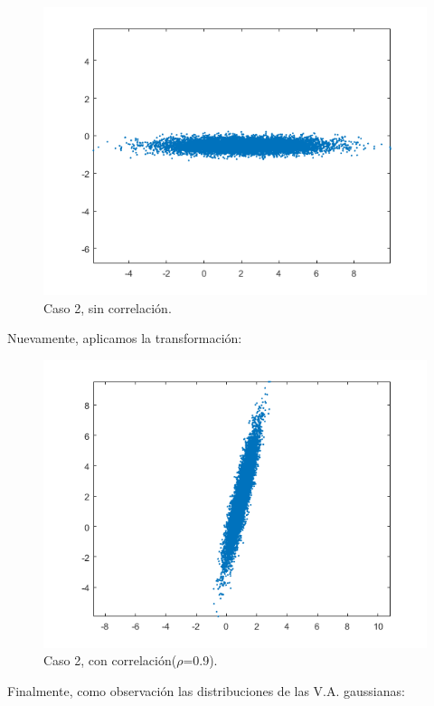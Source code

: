 \begin{figure}[H]
	\centering
	\includegraphics[width=0.5\linewidth]{./ImagenesEjercicio2/GaussianaBivariableSinCorr2.PNG}
	\caption{Caso 2, sin correlación.}
	\label{fig:C2SC}
\end{figure}

Nuevamente, aplicamos la transformación:

\begin{figure}[H]
	\centering
	\includegraphics[width=0.5\linewidth]{./ImagenesEjercicio2/GaussianaBivariableCorr2.PNG}
	\caption{Caso 2, con correlación($\rho$=0.9).}
	\label{fig:C2CC}
\end{figure}

Finalmente, como observación las distribuciones de las V.A. gaussianas:

